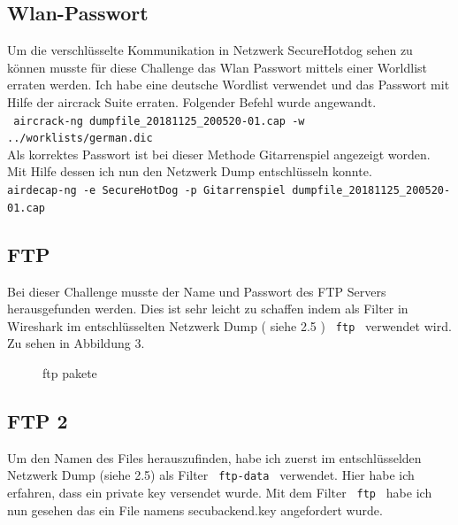 \documentclass[12pt,a4paper,titlepage,oneside]{scrartcl}
\begin{document}
\subsection{Wlan-Passwort}
Um die verschlüsselte Kommunikation in Netzwerk SecureHotdog sehen zu können musste für diese Challenge das Wlan Passwort mittels einer Worldlist erraten werden. Ich habe eine deutsche Wordlist verwendet und das Passwort mit Hilfe der aircrack Suite erraten. Folgender Befehl wurde angewandt. \\
\lstinline{ aircrack-ng dumpfile_20181125_200520-01.cap -w  ../worklists/german.dic } \\
Als korrektes Passwort ist bei dieser Methode Gitarrenspiel angezeigt worden. Mit Hilfe dessen ich nun den Netzwerk Dump entschlüsseln konnte. \\
\lstinline{airdecap-ng -e SecureHotDog -p Gitarrenspiel dumpfile_20181125_200520-01.cap  } 



\subsection{FTP}
Bei dieser Challenge musste der Name und Passwort des FTP Servers herausgefunden werden. Dies ist sehr leicht zu schaffen indem als Filter in Wireshark im entschlüsselten Netzwerk Dump ( siehe 2.5 ) \lstinline{ ftp } verwendet wird. Zu sehen in Abbildung 3.

\begin{figure}[h!]
  \centering
  \caption{ftp pakete}
  \label{fig:Abilldung 3}
\end{figure}

\subsection{FTP 2}
Um den Namen des Files herauszufinden, habe ich zuerst im entschlüsselden Netzwerk Dump (siehe 2.5) als Filter \lstinline{ ftp-data } verwendet. Hier habe ich erfahren, dass ein private key versendet wurde. Mit dem Filter \lstinline{ ftp } habe ich nun gesehen das ein File namens secubackend.key angefordert wurde.
\end{document}
